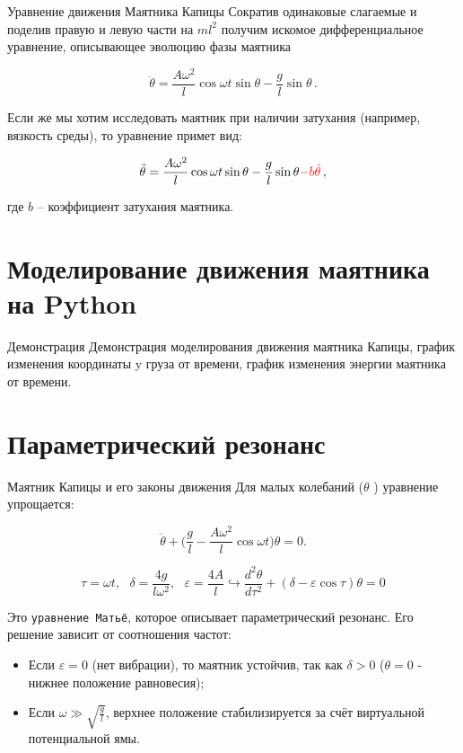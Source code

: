 \documentclass{beamer}
\begin{document}
\begin{frame}{Уравнение движения Маятника Капицы}
    Сократив одинаковые слагаемые и поделив правую и левую части на $ml^2$ получим искомое дифференциальное уравнение, описывающее эволюцию фазы маятника

    \[ \ddot{\theta} = \frac{A \omega^{2}}{l} \cos \omega t \sin \theta - \frac{g}{l} \sin \theta \, . \]

    Если же мы хотим исследовать маятник при наличии затухания (например, вязкость среды), то уравнение примет вид:

    \[ \ddot{\theta} = \frac{A \omega^{2}}{l} \cos \omega t \sin \theta - \frac{g}{l} \sin \theta \color{red}{-b \dot{\theta}}\color{black} \, , \]
    
    где $b$ -- коэффициент затухания маятника.
\end{frame}

\section{Моделирование движения маятника на Python}
\begin{frame}{Демонстрация}
    Демонстрация моделирования движения маятника Капицы, график изменения координаты y груза от времени, график изменения энергии маятника от времени.
\end{frame}

\section{Параметрический резонанс}
\begin{frame}{Маятник Капицы и его законы движения}
    Для малых колебаний ($\theta$ ) уравнение упрощается:
    
    \[ \ddot{\theta}+\Big(\frac{g}{l}-\frac{A\omega^2}{l}\cos{\omega t}\Big)\theta=0. \]

    \[ \tau=\omega t, \text{ } \delta=\frac{4g}{l\omega^2}, \text{ } \varepsilon=\frac{4A}{l} \hookrightarrow \frac{d^2\theta}{d\tau^2}+(\delta-\varepsilon\cos{\tau})\theta=0 \]
    
    Это \texttt{уравнение Матьё}, которое описывает параметрический резонанс. Его решение зависит от соотношения частот:
    \begin{itemize}
        \item Если $\varepsilon=0$ (нет вибрации), то маятник устойчив, так как $\delta>0$ ($\theta=0$ - нижнее положение равновесия);
        \item Если $\omega\gg \sqrt{\frac{g}{l}}$, верхнее положение стабилизируется за счёт виртуальной потенциальной ямы.
    \end{itemize}
\end{frame}
\end{document}
